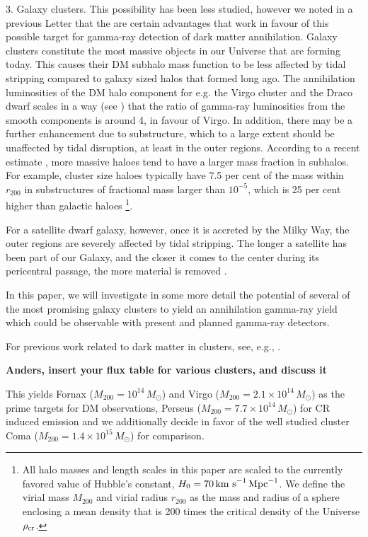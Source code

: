 \documentclass[10pt,aps,pra,reprint,amsmath,amsfonts,amssymb,showpacs]{revtex4-1}
\newcommand{\msun}{{M_\odot}}
\newcommand{\rvir}{r_{200}}
\newcommand{\mvir}{M_{200}}
\begin{document}
3. Galaxy clusters. This possibility has been less studied, however we
noted in a previous Letter \cite{2009PhRvL.103r1302P} that the are
certain advantages that work in favour of this possible target for
gamma-ray detection of dark matter annihilation.  Galaxy clusters
constitute the most massive objects in our Universe that are forming
today. This causes their DM subhalo mass function to be less affected
by tidal stripping compared to galaxy sized halos that formed long
ago.  The annihilation luminosities of the DM halo component for
e.g. the Virgo cluster and the Draco dwarf scales in a way (see
\cite{2009PhRvL.103r1302P}) that the ratio of gamma-ray luminosities
from the smooth components is around 4, in favour of Virgo. In
addition, there may be a further enhancement due to substructure,
which to a large extent should be unaffected by tidal disruption, at
least in the outer regions.  According to a recent estimate
\cite{2011MNRAS.410.2309G}, more massive haloes tend to have a larger
mass fraction in subhalos.  For example, cluster size haloes typically
have 7.5 per cent of the mass within $r_{200}$ in substructures of
fractional mass larger than $10^{-5}$, which is 25 per cent higher
than galactic haloes \footnote{All halo masses and length scales in
  this paper are scaled to the currently favored value of Hubble's
  constant, $H_0 = 70\, \rm{km~s}^{-1}\,\rm{Mpc}^{-1}$. We define the
  virial mass $\mvir$ and virial radius $\rvir$ as the mass and radius
  of a sphere enclosing a mean density that is 200 times the critical
  density of the Universe $\rho_{\rm{cr}}$.}.

For a satellite dwarf galaxy, however, once it is accreted by the
Milky Way, the outer regions are severely affected by tidal
stripping. The longer a satellite has been part of our Galaxy, and the
closer it comes to the center during its pericentral passage, the more
material is removed \cite{2004MNRAS.355..819G}.

In this paper, we will investigate in some more detail the potential
of several of the most promising galaxy clusters to yield an
annihilation gamma-ray yield which could be observable with present
and planned gamma-ray detectors.

For previous work related to dark matter in clusters, see, e.g.,
\cite{2006A&A...455...21C,2009PhRvD..80b3005J}. 


{\bf Anders, insert your flux table for various clusters, and discuss it}

This yields Fornax ($\mvir=10^{14}\,\msun$) and Virgo
($\mvir=2.1\times10^{14}\,\msun$) \cite{} as the prime targets for DM
observations, Perseus ($\mvir=7.7\times10^{14}\,\msun$) for CR induced
emission and we additionally decide in favor of the well studied
cluster Coma ($\mvir=1.4\times10^{15}\,\msun$) for comparison.
\end{document}
